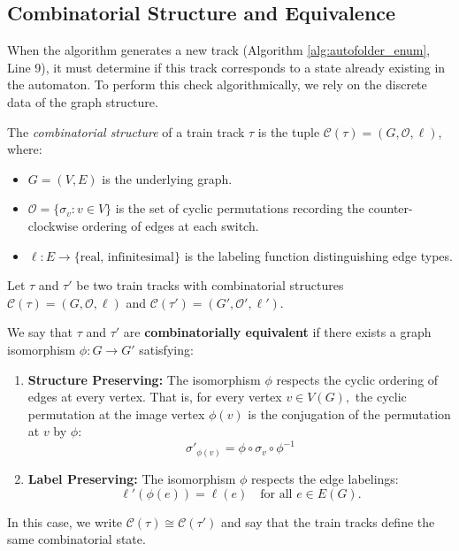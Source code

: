 \subsection{Combinatorial Structure and Equivalence}
\label{subsec:comb_iso}

When the algorithm generates a new track (Algorithm \ref{alg:autofolder_enum}, Line 9), it must determine if this track corresponds to a state already existing in the automaton. To perform this check algorithmically, we rely on the discrete data of the graph structure.

\begin{definition}
    The \textit{combinatorial structure} of a train track $\tau$ is the tuple $\mathcal{C}(\tau) = (G, \mathcal{O}, \ell)$, where:
    \begin{itemize}
        \item $G = (V, E)$ is the underlying graph.
        \item $\mathcal{O} = \{ \sigma_v : v \in V \}$ is the set of cyclic permutations recording the counter-clockwise ordering of edges at each switch.
        \item $\ell: E \to \{ \text{real, infinitesimal} \}$ is the labeling function distinguishing edge types.
    \end{itemize}
\end{definition}

\begin{definition}
    Let $\tau$ and $\tau'$ be two train tracks with combinatorial structures $\mathcal{C}(\tau) = (G, \mathcal{O}, \ell)$ and $\mathcal{C}(\tau') = (G', \mathcal{O}', \ell')$.

    We say that $\tau$ and $\tau'$ are \textbf{combinatorially equivalent} if there exists a graph isomorphism $\phi: G \to G'$ satisfying:
    \begin{enumerate}
        \item \textbf{Structure Preserving:} The isomorphism $\phi$ respects the cyclic ordering of edges at every vertex. That is, for every vertex $v \in V(G), $ the cyclic permutation at the image vertex $\phi(v)$ is the conjugation of the permutation at $v$ by $\phi$:
        \[
            \sigma'_{\phi(v)} = \phi \circ \sigma_v \circ \phi^{-1}
        \]
        \item \textbf{Label Preserving:} The isomorphism $\phi$ respects the edge labelings:
        \[
            \ell'(\phi(e)) = \ell(e) \quad \text{for all } e \in E(G).
        \]
    \end{enumerate}
    In this case, we write $\mathcal{C}(\tau) \cong \mathcal{C}(\tau')$ and say that the train tracks define the same combinatorial state.
\end{definition}

